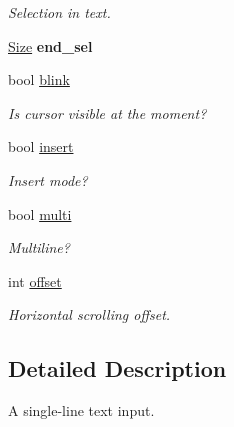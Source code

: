 \begin{DoxyCompactItemize}
\begin{DoxyCompactList}\small\item\em Selection in {\itshape text\/}. \end{DoxyCompactList}\item 
\hypertarget{classGUI_1_1Input_a0aacf882a9a705d09c03e46c3e998ecc}{\hyperlink{namespaceGUI_a10b6232e08729baa0bd211a86a69ce36}{Size} {\bfseries end\-\_\-sel}}\label{classGUI_1_1Input_a0aacf882a9a705d09c03e46c3e998ecc}

\item 
\hypertarget{classGUI_1_1Input_a311ee1e868abf69ca6ba892a6794b68b}{bool \hyperlink{classGUI_1_1Input_a311ee1e868abf69ca6ba892a6794b68b}{blink}}\label{classGUI_1_1Input_a311ee1e868abf69ca6ba892a6794b68b}

\begin{DoxyCompactList}\small\item\em Is cursor visible at the moment? \end{DoxyCompactList}\item 
\hypertarget{classGUI_1_1Input_af399004f35a82c4ef01e392ec17f30d5}{bool \hyperlink{classGUI_1_1Input_af399004f35a82c4ef01e392ec17f30d5}{insert}}\label{classGUI_1_1Input_af399004f35a82c4ef01e392ec17f30d5}

\begin{DoxyCompactList}\small\item\em Insert mode? \end{DoxyCompactList}\item 
\hypertarget{classGUI_1_1Input_adefcd920ff52c2078363d11ce336b7e4}{bool \hyperlink{classGUI_1_1Input_adefcd920ff52c2078363d11ce336b7e4}{multi}}\label{classGUI_1_1Input_adefcd920ff52c2078363d11ce336b7e4}

\begin{DoxyCompactList}\small\item\em Multiline? \end{DoxyCompactList}\item 
\hypertarget{classGUI_1_1Input_ad3725c78fcdbe131c8f209a41f520150}{int \hyperlink{classGUI_1_1Input_ad3725c78fcdbe131c8f209a41f520150}{offset}}\label{classGUI_1_1Input_ad3725c78fcdbe131c8f209a41f520150}

\begin{DoxyCompactList}\small\item\em Horizontal scrolling offset. \end{DoxyCompactList}\end{DoxyCompactItemize}


\subsection{Detailed Description}
A single-\/line text input. 

